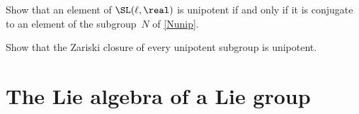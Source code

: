 \begin{exercises}

\item \label{NunipEx}
Show that an element of $\SL(\ell,\real)$ is unipotent if and only if it is conjugate to an element of the subgroup~$N$ of \cref{Nunip}.

\item Show that the Zariski closure of every unipotent subgroup is unipotent. 
%
%	
%	
%
%	
%	

\end{exercises}



\section{The Lie algebra of a Lie group}

